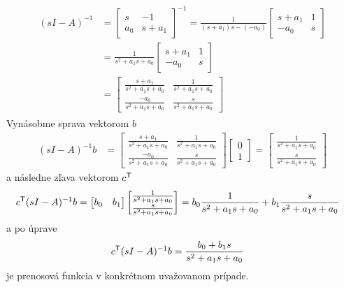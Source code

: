 \documentclass[a4paper, 10pt, ]{article}
\begin{document}
\begin{align}
\begin{aligned}
    (s I - A)^{-1} &=
    \begin{bmatrix}
        s & -1 \\
        a_0 & s + a_1
    \end{bmatrix}^{-1}
    =
    \frac{1}{(s + a_1)s - (-a_0)}
    \begin{bmatrix}
        s + a_1 & 1 \\
        -a_0 & s
    \end{bmatrix} \\
    &=
    \frac{1}{s^2 + a_1s + a_0}
    \begin{bmatrix}
        s + a_1 & 1 \\
        -a_0 & s
    \end{bmatrix} \\
    &=
    \begin{bmatrix}
        \frac{s + a_1}{s^2 + a_1s + a_0} & \frac{1}{s^2 + a_1s + a_0} \\
        \frac{-a_0}{s^2 + a_1s + a_0} & \frac{s}{s^2 + a_1s + a_0}
    \end{bmatrix}
\end{aligned}
\end{align}
Vynásobme sprava vektorom $b$
\begin{align}
    (s I - A)^{-1} b &=
    \begin{bmatrix}
        \frac{s + a_1}{s^2 + a_1s + a_0} & \frac{1}{s^2 + a_1s + a_0} \\
        \frac{-a_0}{s^2 + a_1s + a_0} & \frac{s}{s^2 + a_1s + a_0}
    \end{bmatrix}
    \begin{bmatrix}
        0 \\ 1
    \end{bmatrix}
    =
    \begin{bmatrix}
        \frac{1}{s^2 + a_1s + a_0} \\
        \frac{s}{s^2 + a_1s + a_0}
    \end{bmatrix}
\end{align}
a následne zľava vektorom $c^{\mathsf{T}}$
\begin{align}
    c^{\mathsf{T}} (s I - A)^{-1} b &=
    \begin{bmatrix}
        b_0 & b_1
    \end{bmatrix}
    \begin{bmatrix}
        \frac{1}{s^2 + a_1s + a_0} \\
        \frac{s}{s^2 + a_1s + a_0}
    \end{bmatrix}
    =
    b_0 \frac{1}{s^2 + a_1s + a_0} + b_1 \frac{s}{s^2 + a_1s + a_0}
\end{align}
a po úprave
\begin{align}
    c^{\mathsf{T}} (s I - A)^{-1} b &=
    \frac{b_0 + b_1 s}{s^2 + a_1s + a_0} 
\end{align}
je prenosová funkcia v konkrétnom uvažovanom prípade.
\end{document}
